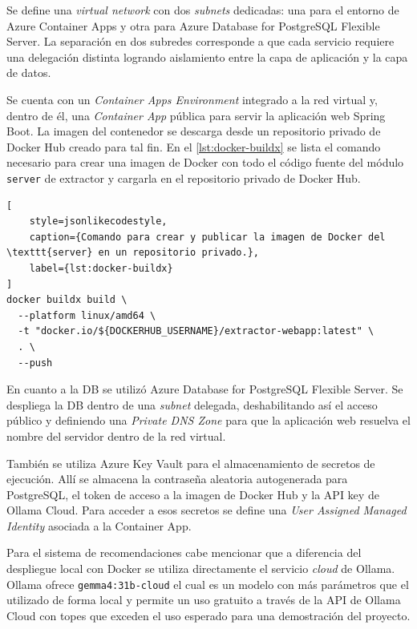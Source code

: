 \FloatBarrier{}

Se define una \textit{virtual network} con dos \textit{subnets} dedicadas: una para el entorno de Azure
Container Apps y otra para Azure Database for PostgreSQL Flexible Server.
La separación en dos subredes corresponde a que cada servicio requiere una delegación distinta logrando
aislamiento entre la capa de aplicación y la capa de datos.

Se cuenta con un \textit{Container Apps Environment} integrado a la red virtual y, dentro de él, una
\textit{Container App} pública para servir la aplicación web Spring Boot.
La imagen del contenedor se descarga desde un repositorio privado de Docker Hub creado para tal fin.
En el \autoref{lst:docker-buildx} se lista el comando necesario para crear una imagen de Docker con todo el código
fuente del módulo \texttt{server} de extractor y cargarla en el repositorio privado de Docker Hub.

\begin{lstlisting}[
    style=jsonlikecodestyle,
    caption={Comando para crear y publicar la imagen de Docker del \texttt{server} en un repositorio privado.},
    label={lst:docker-buildx}
]
docker buildx build \
  --platform linux/amd64 \
  -t "docker.io/${DOCKERHUB_USERNAME}/extractor-webapp:latest" \
  . \
  --push
\end{lstlisting}

En cuanto a la DB se utilizó Azure Database for PostgreSQL Flexible Server.
Se despliega la DB dentro de una \textit{subnet} delegada, deshabilitando así el acceso público y definiendo una
\textit{Private DNS Zone} para que la aplicación web resuelva el nombre del servidor dentro de la red virtual.

También se utiliza Azure Key Vault para el almacenamiento de secretos de ejecución.
Allí se almacena la contraseña aleatoria autogenerada para PostgreSQL, el token de acceso a la imagen de
Docker Hub y la API key de Ollama Cloud.
Para acceder a esos secretos se define una \textit{User Assigned Managed Identity} asociada a la Container App.

Para el sistema de recomendaciones cabe mencionar que a diferencia del despliegue local con Docker se utiliza
directamente el servicio \textit{cloud} de Ollama.
Ollama ofrece \texttt{gemma4:31b-cloud} el cual es un modelo con más parámetros que el utilizado de forma local y
permite un uso gratuito a través de la API de Ollama Cloud con topes que exceden el uso esperado para una demostración
del proyecto.

